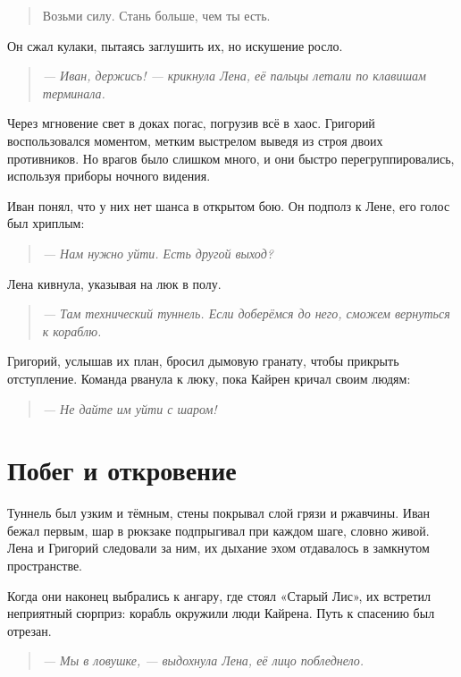 \documentclass[12pt,a4paper]{book}
\newenvironment{dialogue}{\begin{quote}\itshape}{\end{quote}} %
\begin{document}
\begin{quote}
Возьми силу. Стань больше, чем ты есть.
\end{quote}

Он сжал кулаки, пытаясь заглушить их, но искушение росло.

\begin{dialogue}
--- Иван, держись! --- крикнула Лена, её пальцы летали по клавишам терминала.
\end{dialogue}

Через мгновение свет в доках погас, погрузив всё в хаос. Григорий воспользовался моментом, метким выстрелом выведя из строя двоих противников. Но врагов было слишком много, и они быстро перегруппировались, используя приборы ночного видения.

Иван понял, что у них нет шанса в открытом бою. Он подполз к Лене, его голос был хриплым:

\begin{dialogue}
--- Нам нужно уйти. Есть другой выход?
\end{dialogue}

Лена кивнула, указывая на люк в полу.

\begin{dialogue}
--- Там технический туннель. Если доберёмся до него, сможем вернуться к кораблю.
\end{dialogue}

Григорий, услышав их план, бросил дымовую гранату, чтобы прикрыть отступление. Команда рванула к люку, пока Кайрен кричал своим людям:

\begin{dialogue}
--- Не дайте им уйти с шаром!
\end{dialogue}

\section*{Побег и откровение}

Туннель был узким и тёмным, стены покрывал слой грязи и ржавчины. Иван бежал первым, шар в рюкзаке подпрыгивал при каждом шаге, словно живой. Лена и Григорий следовали за ним, их дыхание эхом отдавалось в замкнутом пространстве.

Когда они наконец выбрались к ангару, где стоял «Старый Лис», их встретил неприятный сюрприз: корабль окружили люди Кайрена. Путь к спасению был отрезан.

\begin{dialogue}
--- Мы в ловушке, --- выдохнула Лена, её лицо побледнело.
\end{dialogue}
\end{document}
